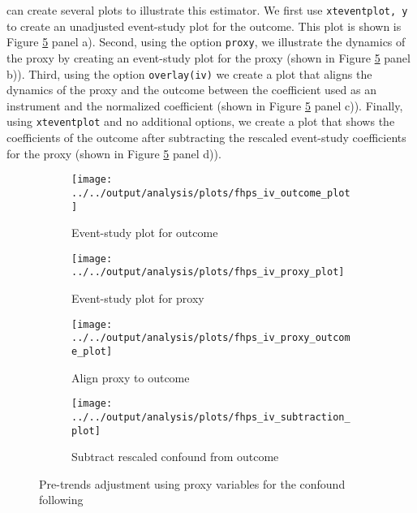\documentclass[bib]{./sty/statapress}
\begin{document}
\xteventplot can create several plots to illustrate this estimator.
We first use \texttt{xteventplot, y} to create an unadjusted event-study plot for the outcome.
This plot is shown is Figure \ref{fig:overlayfhs} panel a).
Second, using the option \texttt{proxy}, we illustrate the dynamics of the proxy by creating an event-study plot for the proxy (shown in Figure \ref{fig:overlayfhs} panel b)).
Third, using the option \texttt{overlay(iv)} we create a plot that aligns the dynamics of the proxy and the outcome between the coefficient used as an instrument and the normalized coefficient (shown in Figure \ref{fig:overlayfhs} panel c)).
Finally, using \texttt{xteventplot} and no additional options, we create a plot that shows the coefficients of the outcome after subtracting the rescaled event-study coefficients for the proxy (shown in Figure \ref{fig:overlayfhs} panel d)).
\begin{stlog}
\nullskip
\nullskip
\nullskip
\nullskip
\end{stlog}

\begin{figure}[h!]
\centering
\begin{subfigure}{0.5\textwidth}
  \centering
  \texttt{[image: ../../output/analysis/plots/fhps\_iv\_outcome\_plot]}
  \caption{Event-study plot for outcome}
  \label{fig:overlayfhs1}
\end{subfigure}%
\begin{subfigure}{0.5\textwidth}
  \centering
  \texttt{[image: ../../output/analysis/plots/fhps\_iv\_proxy\_plot]}
  \caption{Event-study plot for proxy}
  \label{fig:overlayfhs2}
\end{subfigure}%

\begin{subfigure}{0.5\textwidth}
  \centering
  \texttt{[image: ../../output/analysis/plots/fhps\_iv\_proxy\_outcome\_plot]}
  \caption{Align proxy to outcome}
  \label{fig:overlayfhs3}
\end{subfigure}%
\begin{subfigure}{0.5\textwidth}
  \centering
  \texttt{[image: ../../output/analysis/plots/fhps\_iv\_subtraction\_plot]}
  \caption{Subtract rescaled confound from outcome}
  \label{fig:overlayfhs4}
\end{subfigure}%

\caption{Pre-trends adjustment using proxy variables for the confound following \cite{freyaldenhoven2019pre}}
\label{fig:overlayfhs}
\end{figure}
\end{document}
